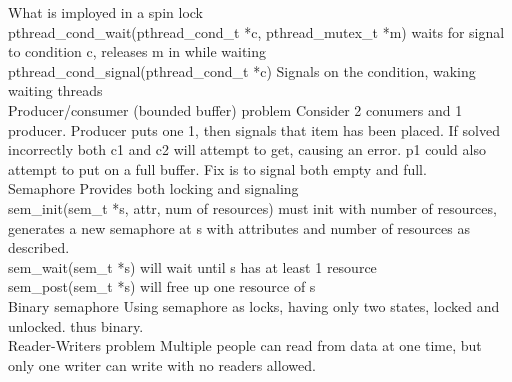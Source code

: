 \documentclass[6pt]{article}
\begin{document}
What is imployed in a spin lock
\\
pthread\_cond\_wait(pthread\_cond\_t *c, pthread\_mutex\_t *m)
waits for signal to condition c, releases m in while waiting
\\
pthread\_cond\_signal(pthread\_cond\_t *c)
Signals on the condition, waking waiting threads
\\
Producer/consumer (bounded buffer) problem
Consider 2 conumers and 1 producer. Producer puts one 1, then signals that item has been placed. If solved incorrectly both c1 and c2 will attempt to get, causing an error. p1 could also attempt to put on a full buffer.
Fix is to signal both empty and full.
\\
Semaphore
Provides both locking and signaling
\\
sem\_init(sem\_t *s, attr, num of resources)
must init with number of resources, generates a new semaphore at s with attributes and number of resources as described.
\\
sem\_wait(sem\_t *s)
will wait until s has at least 1 resource
\\
sem\_post(sem\_t *s)
will free up one resource of s
\\
Binary semaphore
Using semaphore as locks, having only two states, locked and unlocked. thus binary.
\\
Reader-Writers problem
Multiple people can read from data at one time, but only one writer can write with no readers allowed.
\end{document}
